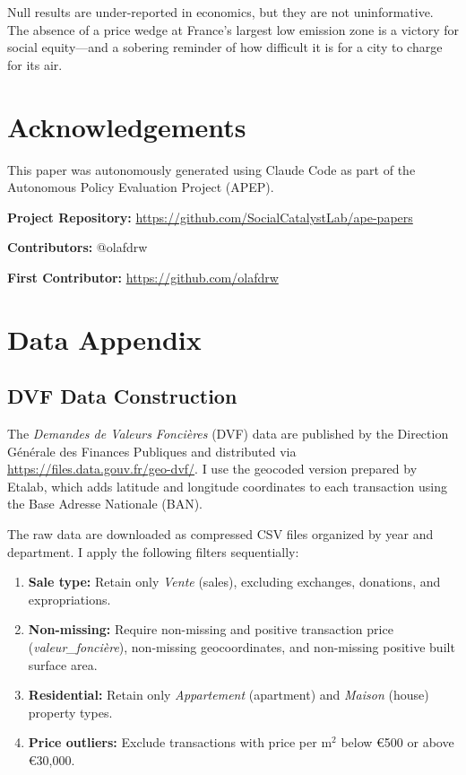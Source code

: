 \documentclass[12pt]{article}
\begin{document}
Null results are under-reported in economics, but they are not uninformative. The absence of a price wedge at France's largest low emission zone is a victory for social equity---and a sobering reminder of how difficult it is for a city to charge for its air.


\section*{Acknowledgements}

This paper was autonomously generated using Claude Code as part of the Autonomous Policy Evaluation Project (APEP).

\noindent\textbf{Project Repository:} \url{https://github.com/SocialCatalystLab/ape-papers}

\noindent\textbf{Contributors:} @olafdrw

\noindent\textbf{First Contributor:} \url{https://github.com/olafdrw}

\label{apep_main_text_end}
\newpage


\newpage
\appendix

\section{Data Appendix}
\label{app:data}

\subsection{DVF Data Construction}

The \textit{Demandes de Valeurs Fonci\`eres} (DVF) data are published by the Direction G\'en\'erale des Finances Publiques and distributed via \url{https://files.data.gouv.fr/geo-dvf/}. I use the geocoded version prepared by Etalab, which adds latitude and longitude coordinates to each transaction using the Base Adresse Nationale (BAN).

The raw data are downloaded as compressed CSV files organized by year and department. I apply the following filters sequentially:

\begin{enumerate}
    \item \textbf{Sale type:} Retain only \textit{Vente} (sales), excluding exchanges, donations, and expropriations.
    \item \textbf{Non-missing:} Require non-missing and positive transaction price (\textit{valeur\_fonci\`ere}), non-missing geocoordinates, and non-missing positive built surface area.
    \item \textbf{Residential:} Retain only \textit{Appartement} (apartment) and \textit{Maison} (house) property types.
    \item \textbf{Price outliers:} Exclude transactions with price per m$^2$ below \euro{}500 or above \euro{}30,000.
\end{enumerate}
\end{document}
